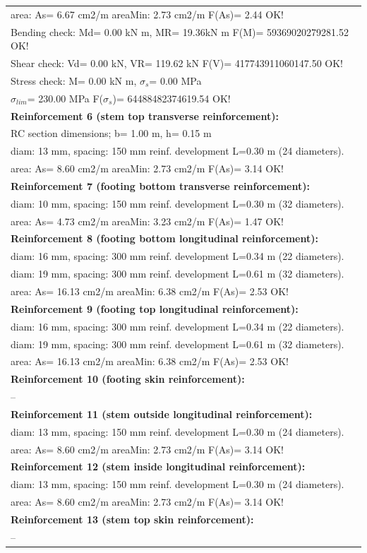 \begin{center}
\begin{supertabular}[H]{|l|}
  area: As=   6.67 cm2/m areaMin:   2.73 cm2/m  F(As)= 2.44 OK!\\
  Bending check: Md=   0.00 kN m, MR=  19.36kN m  F(M)= 59369020279281.52 OK!\\
  Shear check: Vd=   0.00 kN,  VR= 119.62 kN  F(V)= 417743911060147.50 OK!\\
  Stress check: M=   0.00 kN m, $\sigma_s$=   0.00 MPa\\
    $\sigma_{lim}$= 230.00 MPa  F($\sigma_s$)= 64488482374619.54 OK!\\
\textbf{Reinforcement 6 (stem top transverse reinforcement):}\\
  RC section dimensions; b= 1.00 m, h= 0.15 m\\
  diam: 13 mm, spacing: 150 mm  reinf. development L=0.30 m (24 diameters).\\
  area: As=   8.60 cm2/m areaMin:   2.73 cm2/m  F(As)= 3.14 OK!\\
\textbf{Reinforcement 7 (footing bottom transverse reinforcement):}\\
  diam: 10 mm, spacing: 150 mm  reinf. development L=0.30 m (32 diameters).\\
  area: As=   4.73 cm2/m areaMin:   3.23 cm2/m  F(As)= 1.47 OK!\\
\textbf{Reinforcement 8 (footing bottom longitudinal reinforcement):}\\
  diam: 16 mm, spacing: 300 mm  reinf. development L=0.34 m (22 diameters).\\
  diam: 19 mm, spacing: 300 mm  reinf. development L=0.61 m (32 diameters).\\
  area: As=  16.13 cm2/m areaMin:   6.38 cm2/m  F(As)= 2.53 OK!\\
\textbf{Reinforcement 9 (footing top longitudinal reinforcement):}\\
  diam: 16 mm, spacing: 300 mm  reinf. development L=0.34 m (22 diameters).\\
  diam: 19 mm, spacing: 300 mm  reinf. development L=0.61 m (32 diameters).\\
  area: As=  16.13 cm2/m areaMin:   6.38 cm2/m  F(As)= 2.53 OK!\\
\textbf{Reinforcement 10 (footing skin reinforcement):}\\
  --\\
\textbf{Reinforcement 11 (stem outside longitudinal reinforcement):}\\
  diam: 13 mm, spacing: 150 mm  reinf. development L=0.30 m (24 diameters).\\
  area: As=   8.60 cm2/m areaMin:   2.73 cm2/m  F(As)= 3.14 OK!\\
\textbf{Reinforcement 12 (stem inside longitudinal reinforcement):}\\
  diam: 13 mm, spacing: 150 mm  reinf. development L=0.30 m (24 diameters).\\
  area: As=   8.60 cm2/m areaMin:   2.73 cm2/m  F(As)= 3.14 OK!\\
\textbf{Reinforcement 13 (stem top skin reinforcement):}\\
  --\\
\hline
\end{supertabular}
\end{center}
